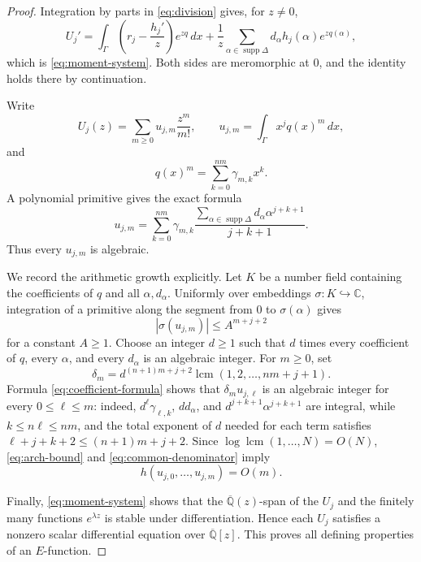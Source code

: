 \documentclass[11pt]{article}
\numberwithin{equation}{section}
\theoremstyle{definition}
\theoremstyle{remark}
\newcommand{\C}{\mathbb C}
\newcommand{\Qbar}{\overline{\mathbb Q}}
\newcommand{\supp}{\operatorname{supp}}
\begin{document}
\begin{proof}
Integration by parts in \eqref{eq:division} gives, for $z\ne0$,
\[
  U_j'
  =\int_\Gamma\left(r_j-\frac{h_j'}z\right)e^{zq}\,dx
   +\frac1z\sum_{\alpha\in\supp\Delta}
      d_\alpha h_j(\alpha)e^{zq(\alpha)},
\]
which is \eqref{eq:moment-system}.  Both sides are meromorphic at $0$, and
the identity holds there by continuation.

Write
\[
  U_j(z)=\sum_{m\ge0}u_{j,m}\frac{z^m}{m!},
  \qquad
  u_{j,m}=\int_\Gamma x^j q(x)^m\,dx,
\]
and
\[
  q(x)^m=\sum_{k=0}^{nm}\gamma_{m,k}x^k.
\]
A polynomial primitive gives the exact formula
\begin{equation}\label{eq:coefficient-formula}
  u_{j,m}=\sum_{k=0}^{nm}\gamma_{m,k}
  \frac{\displaystyle\sum_{\alpha\in\supp\Delta}
        d_\alpha\alpha^{j+k+1}}{j+k+1}.
\end{equation}
Thus every $u_{j,m}$ is algebraic.

We record the arithmetic growth explicitly.  Let $K$ be a number field
containing the coefficients of $q$ and all $\alpha,d_\alpha$.  Uniformly
over embeddings $\sigma:K\hookrightarrow\C$, integration of a primitive
along the segment from $0$ to $\sigma(\alpha)$ gives
\begin{equation}\label{eq:arch-bound}
  |\sigma(u_{j,m})|\le A^{m+j+2}
\end{equation}
for a constant $A\ge1$.  Choose an integer $d\ge1$ such that $d$ times
every coefficient of $q$, every $\alpha$, and every $d_\alpha$ is an
algebraic integer.  For $m\ge0$, set
\begin{equation}\label{eq:common-denominator}
  \delta_m=
  d^{(n+1)m+j+2}\operatorname{lcm}(1,2,\ldots,nm+j+1).
\end{equation}
Formula \eqref{eq:coefficient-formula} shows that
$\delta_m u_{j,\ell}$ is an algebraic integer for every $0\le\ell\le m$:
indeed, $d^\ell\gamma_{\ell,k}$, $d d_\alpha$, and
$d^{j+k+1}\alpha^{j+k+1}$ are integral, while
$k\le n\ell\le nm$, and the total exponent of $d$ needed for each term
satisfies $\ell+j+k+2\le(n+1)m+j+2$.  Since
$\log\operatorname{lcm}(1,\ldots,N)=O(N)$, \eqref{eq:arch-bound} and
\eqref{eq:common-denominator} imply
\[
  h(u_{j,0},\ldots,u_{j,m})=O(m).
\]

Finally, \eqref{eq:moment-system} shows that the $\Qbar(z)$-span of the
$U_j$ and the finitely many functions $e^{\lambda z}$ is stable under
differentiation.  Hence each $U_j$ satisfies a nonzero scalar differential
equation over $\Qbar[z]$.  This proves all defining properties of an
$E$-function.
\end{proof}
\end{document}
